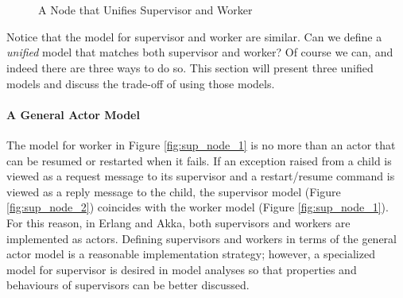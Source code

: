 \begin{figure}[p]
\begin{adjustwidth}{-2.5cm}{} 
        \\
        \\
    \caption{A Node that Unifies Supervisor and Worker}
 \end{adjustwidth}    
   \label{fig:unify}
\end{figure}

Notice that the model for supervisor and worker are similar.  Can we define 
a {\it unified} model that matches both supervisor and worker?  Of course we 
can, and indeed there are three ways to do so.  This section will present three 
unified models and discuss the trade-off of using those models.

\paragraph{A General Actor Model}
The model for worker in Figure \ref{fig:sup_node_1} is no more than an actor 
that can be resumed or restarted when it fails.  If an exception raised from a 
child is viewed as a request message to its supervisor and a restart/resume 
command is viewed as a reply message to the child, the supervisor model (Figure 
\ref{fig:sup_node_2}) coincides with the worker model (Figure 
\ref{fig:sup_node_1}).  For this reason, in Erlang and Akka, both supervisors 
and workers are implemented as actors.  Defining supervisors and workers in 
terms of the general actor model is a reasonable implementation strategy; 
however, a specialized model for supervisor is desired in model analyses so 
that properties and behaviours of supervisors can be better discussed.

